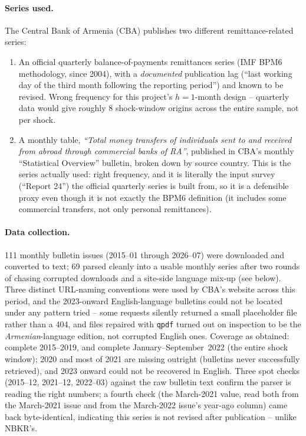 \documentclass[11pt]{article}
\begin{document}
\paragraph{Series used.} The Central Bank of Armenia (CBA) publishes two different
remittance-related series:
\begin{enumerate}
\item An official quarterly balance-of-payments remittances series (IMF BPM6 methodology,
  since 2004), with a \emph{documented} publication lag (``last working day of the third month
  following the reporting period'') and known to be revised. Wrong frequency for this project's
  $h=1$-month design -- quarterly data would give roughly 8 shock-window origins across the
  entire sample, not per shock.
\item A monthly table, \emph{``Total money transfers of individuals sent to and received from
  abroad through commercial banks of RA''}, published in CBA's monthly ``Statistical Overview''
  bulletin, broken down by source country. This is the series actually used: right frequency,
  and it is literally the input survey (``Report 24'') the official quarterly series is built
  from, so it is a defensible proxy even though it is not exactly the BPM6 definition (it
  includes some commercial transfers, not only personal remittances).
\end{enumerate}

\paragraph{Data collection.} 111 monthly bulletin issues (2015--01 through 2026--07) were
downloaded and converted to text; 69 parsed cleanly into a usable monthly series after two
rounds of chasing corrupted downloads and a site-side language mix-up (see below). Three
distinct URL-naming conventions were used by CBA's website across this period, and the
2023-onward English-language bulletins could not be located under any pattern tried -- some
requests silently returned a small placeholder file rather than a 404, and files repaired with
\texttt{qpdf} turned out on inspection to be the \emph{Armenian}-language edition, not corrupted
English ones. Coverage as obtained: complete 2015--2019, and complete January--September~2022
(the entire shock window); 2020 and most of 2021 are missing outright (bulletins never
successfully retrieved), and 2023 onward could not be recovered in English. Three spot checks
(2015--12, 2021--12, 2022--03) against the raw bulletin text confirm the parser is reading the
right numbers; a fourth check (the March-2021 value, read both from the March-2021 issue and
from the March-2022 issue's year-ago column) came back byte-identical, indicating this series is
not revised after publication -- unlike NBKR's.
\end{document}
